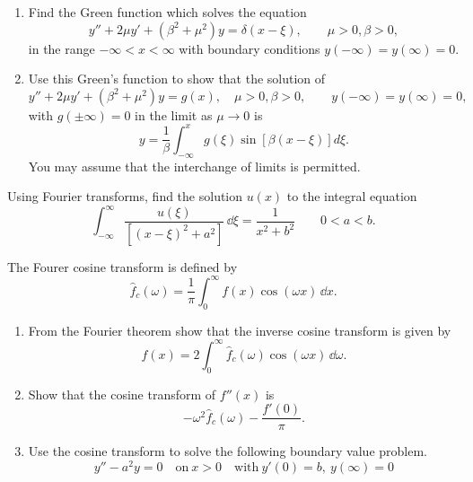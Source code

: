 {%
\begin{Exercise}
  \label{exercise ode ft green y+2my+b2m2y=d}
  \begin{enumerate}
  \item Find the Green function which solves the equation
    \[
    y'' + 2\mu y' + (\beta^2 + \mu^2) y = \delta(x-\xi), \qquad \mu>0, \beta >0,
    \]
    in the range $-\infty < x < \infty$ with boundary conditions
    $y(-\infty) = y(\infty) = 0$.
  \item Use this Green's function to show that the solution of
    \[
    y'' + 2\mu y' + (\beta^2 + \mu^2) y = g(x), \quad \mu>0, \beta >0,\qquad
    y(-\infty) = y(\infty) = 0,
    \]
    with $g(\pm\infty) = 0$ in the limit as $\mu \to 0$ is
    \[
    y = \frac{1}{\beta} \int_{-\infty}^x g(\xi) \sin[\beta(x -\xi)] d\xi.
    \]
    You may assume that the interchange of limits is permitted.
  \end{enumerate}

\end{Exercise}






\begin{Exercise}
  \label{exercise ode ft int eqn u/xxi2+a2}
  Using Fourier transforms, find the solution
  $u(x)$ to the integral equation
  \[
  \int_{-\infty}^{\infty} \frac{u(\xi)}{\left[(x-\xi)^2 + a^2\right]} \,\dd \xi
  = \frac{1}{x^2 + b^2} \qquad 0<a<b.
  \]

\end{Exercise}






\begin{Exercise}
  \label{exercise ode ft ifct f''}
  The Fourer cosine transform is defined by
  \[
  \hat{f}_c(\omega) = \frac{1}{\pi} \int_0^\infty f(x) \cos(\omega x) \,\dd x.
  \]
  \begin{enumerate}
  \item 
    From the Fourier theorem show that the inverse cosine transform 
    is given by
    \[
    f(x) = 2 \int_0^\infty \hat{f}_c(\omega) \cos(\omega x) \,\dd \omega.
    \]
  \item  
    Show that the cosine transform of $f''(x)$ is
    \[
    -\omega^2 \hat{f}_c(\omega) - \frac{f'(0)}{\pi}.
    \]
  \item  
    Use the cosine transform to solve the following boundary value problem.
    \[
    y'' - a^2 y = 0 \quad \mathrm{on}\ x > 0 
    \quad \mathrm{with}\ y'(0) = b,\ y(\infty) = 0
    \]
  \end{enumerate}


\end{Exercise}}
